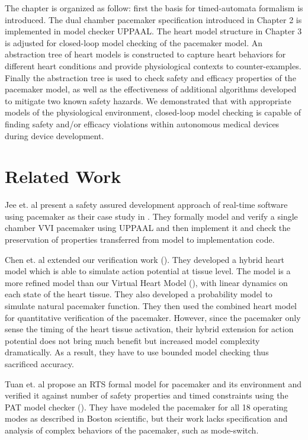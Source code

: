 The chapter is organized as follow: first the basis for timed-automata formalism is introduced.
The dual chamber pacemaker specification introduced in Chapter 2 is implemented in model checker UPPAAL.
The heart model structure in Chapter 3 is adjusted for closed-loop model checking of the pacemaker model.
An abstraction tree of heart models is constructed to capture heart behaviors for different heart conditions and provide physiological contexts to counter-examples.
Finally the abstraction tree is used to check safety and efficacy properties of the pacemaker model, as well as the effectiveness of additional algorithms developed to mitigate two known safety hazards. 
We demonstrated that with appropriate models of the physiological environment, closed-loop model checking is capable of finding safety and/or efficacy violations within autonomous medical devices during device development.

\section{Related Work}
Jee et. al present a safety assured development approach of real-time software using pacemaker as their case study in \cite{Jee}. They formally model and verify a single chamber VVI pacemaker using UPPAAL and then implement it and check the preservation of properties transferred from model to implementation code. 

Chen et. al \cite{Marta} extended our verification work (\cite{TACAS12}). They developed a hybrid heart model which is able to simulate action potential at tissue level. The model is a more refined model than our Virtual Heart Model (\cite{VHM_proc}), with linear dynamics on each state of the heart tissue. They also developed a probability model to simulate natural pacemaker function. They then used the combined heart model for quantitative verification of the pacemaker. However, since the pacemaker only sense the timing of the heart tissue activation, their hybrid extension for action potential does not bring much benefit but increased model complexity dramatically. As a result, they have to use bounded model checking thus sacrificed accuracy.

Tuan et. al propose an RTS formal model for pacemaker and its environment and verified it against number of safety properties and timed constraints using the PAT model checker (\cite{Tuan}). They have modeled the pacemaker for all 18 operating modes as described in Boston scientific, but their work lacks specification and analysis of complex behaviors of the pacemaker, such as mode-switch.

